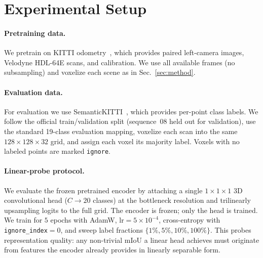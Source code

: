 \section{Experimental Setup}
\label{sec:setup}

\paragraph{Pretraining data.}
We pretrain on KITTI odometry~\cite{kittiraw,kittibench}, which provides
paired left-camera images, Velodyne HDL-64E scans, and calibration. We
use all available frames (no subsampling) and voxelize each scene as in
Sec.~\ref{sec:method}.

\paragraph{Evaluation data.}
For evaluation we use SemanticKITTI~\cite{semantickitti}, which provides
per-point class labels. We follow the official train/validation split
(sequence~08 held out for validation), use the standard 19-class
evaluation mapping, voxelize each scan into the same
$128\times128\times32$ grid, and assign each voxel its majority label.
Voxels with no labeled points are marked \texttt{ignore}.

\paragraph{Linear-probe protocol.}
We evaluate the frozen pretrained encoder by attaching a single
$1\times1\times1$ 3D convolutional head ($C\!\rightarrow\!20$ classes) at
the bottleneck resolution and trilinearly upsampling logits to the full
grid. The encoder is frozen; only the head is trained. We train for $5$
epochs with AdamW, $\text{lr}=5\times10^{-4}$, cross-entropy with
\texttt{ignore\_index}$=0$, and sweep label fractions
$\{1\%,5\%,10\%,100\%\}$. This probes representation quality: any
non-trivial mIoU a linear head achieves must originate from features the
encoder already provides in linearly separable form.

